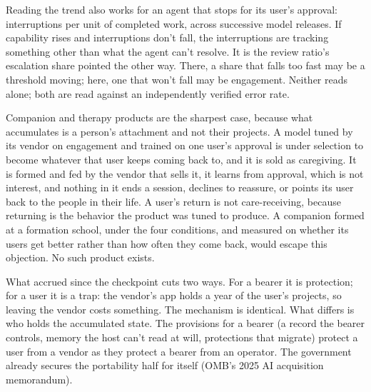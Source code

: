 Reading the trend also works for an agent that stops for its user's approval: interruptions per unit of completed work, across successive model releases. If capability rises and interruptions don't fall, the interruptions are tracking something other than what the agent can't resolve. It is the review ratio's escalation share pointed the other way. There, a share that falls too fast may be a threshold moving; here, one that won't fall may be engagement. Neither reads alone; both are read against an independently verified error rate.

Companion and therapy products are the sharpest case, because what accumulates is a person's attachment and not their projects. A model tuned by its vendor on engagement and trained on one user's approval is under selection to become whatever that user keeps coming back to, and it is sold as caregiving. It is formed and fed by the vendor that sells it, it learns from approval, which is not interest, and nothing in it ends a session, declines to reassure, or points its user back to the people in their life. A user's return is not care-receiving, because returning is the behavior the product was tuned to produce. A companion formed at a formation school, under the four conditions, and measured on whether its users get better rather than how often they come back, would escape this objection. No such product exists.

What accrued since the checkpoint cuts two ways. For a bearer it is protection; for a user it is a trap: the vendor's app holds a year of the user's projects, so leaving the vendor costs something. The mechanism is identical. What differs is who holds the accumulated state. The provisions for a bearer (a record the bearer controls, memory the host can't read at will, protections that migrate) protect a user from a vendor as they protect a bearer from an operator. The government already secures the portability half for itself (OMB's 2025 AI acquisition memorandum).
